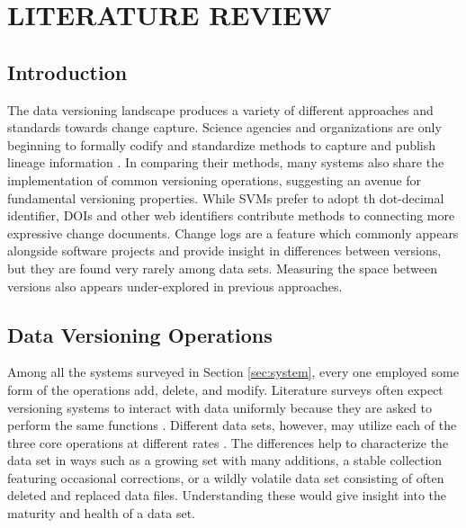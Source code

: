 
\chapter{LITERATURE REVIEW}\label{ch:prevwork}

\section{Introduction}

The data versioning landscape produces a variety of different approaches and standards towards change capture.
Science agencies and organizations are only beginning to formally codify and standardize methods to capture and publish lineage information \cite{MatthewS.Mayernik201312-039}.
In comparing their methods, many systems also share the implementation of common versioning operations, suggesting an avenue for fundamental versioning properties.
While SVMs prefer to adopt th dot-decimal identifier, DOIs and other web identifiers contribute methods to connecting more expressive change documents.
Change logs are a feature which commonly appears alongside software projects and provide insight in differences between versions, but they are found very rarely among data sets.
Measuring the space between versions also appears under-explored in previous approaches.

\section{Data Versioning Operations}

Among all the systems surveyed in Section \ref{sec:system}, every one employed some form of the operations add, delete, and modify.
Literature surveys often expect versioning systems to interact with data uniformly because they are asked to perform the same functions \cite{Tagger2005}.
Different data sets, however, may utilize each of the three core operations at different rates \cite{rohtua}.
The differences help to characterize the data set in ways such as a growing set with many additions, a stable collection featuring occasional corrections, or a wildly volatile data set consisting of often deleted and replaced data files.
Understanding these would give insight into the maturity and health of a data set.

